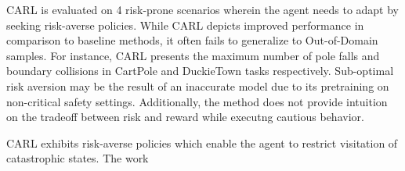 \documentclass[11pt,letterpaper]{article}
\begin{document}
CARL is evaluated on 4 risk-prone scenarios wherein the agent needs to adapt by seeking risk-averse policies. While CARL depicts improved performance in comparison to baseline methods, it often fails to generalize to Out-of-Domain samples. For instance, CARL presents the maximum number of pole falls and boundary collisions in CartPole and DuckieTown tasks respectively. Sub-optimal risk aversion may be the result of an inaccurate model due to its pretraining on non-critical safety settings. Additionally, the method does not provide intuition on the tradeoff between risk and reward while executng cautious behavior. 

CARL exhibits risk-averse policies which enable the agent to restrict visitation of catastrophic states. The work 
\end{document}
